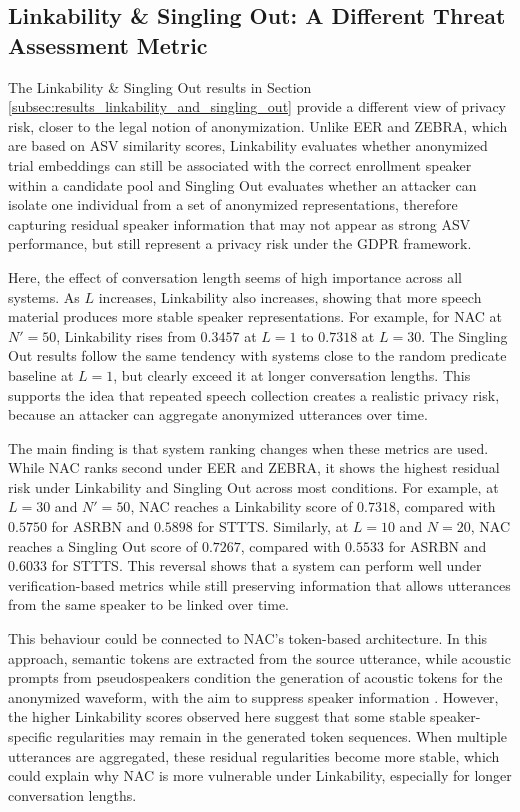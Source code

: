 \documentclass[12pt,leqno,a4paper]{article}
\begin{document}
\subsection{Linkability \& Singling Out: A Different Threat Assessment Metric}
\label{subsubsec:linkabilty_and_singling_out_a_different_threat_metric}

The Linkability \& Singling Out results in Section \ref{subsec:results_linkability_and_singling_out} provide a different view of privacy risk, closer to the legal notion of anonymization. 
Unlike EER and ZEBRA, which are based on ASV similarity scores, Linkability evaluates whether anonymized trial embeddings can still be associated with the correct enrollment speaker within a candidate pool 
and Singling Out evaluates whether an attacker can isolate one individual from a set of anonymized representations, therefore capturing residual speaker information that may not appear as strong ASV 
performance, but still represent a privacy risk under the GDPR framework.

Here, the effect of conversation length seems of high importance across all systems. As $L$ increases, Linkability also increases, 
showing that more speech material produces more stable speaker representations. For example, for NAC at $N'=50$, Linkability rises from $0.3457$ at $L=1$ to $0.7318$ at $L=30$. 
The Singling Out results follow the same tendency with systems close to the random predicate baseline at $L=1$, but clearly exceed it at longer conversation lengths. 
This supports the idea that repeated speech collection creates a realistic privacy risk, because an attacker can aggregate anonymized utterances over time.

The main finding is that system ranking changes when these metrics are used. While NAC ranks second under EER and ZEBRA, it shows the highest residual risk under Linkability 
and Singling Out across most conditions. For example, at $L=30$ and $N'=50$, NAC reaches a Linkability score of $0.7318$, compared with $0.5750$ for 
ASRBN and $0.5898$ for STTTS. Similarly, at $L=10$ and $N=20$, NAC reaches a Singling Out score of $0.7267$, compared with $0.5533$ for ASRBN and $0.6033$ for STTTS. 
This reversal shows that a system can perform well under verification-based metrics while still preserving information that allows utterances from the same speaker to be linked over time.

This behaviour could be connected to NAC's token-based architecture. In this approach, semantic tokens are extracted from the source utterance, while acoustic prompts from pseudospeakers condition the 
generation of acoustic tokens for the anonymized waveform, with the aim to suppress speaker information \citep{panariello_speaker_2024}. 
However, the higher Linkability scores observed here suggest that some stable speaker-specific regularities may remain in the generated token sequences. 
When multiple utterances are aggregated, these residual regularities become more stable, which could explain why NAC is more vulnerable under Linkability, especially for longer conversation lengths.
\end{document}

